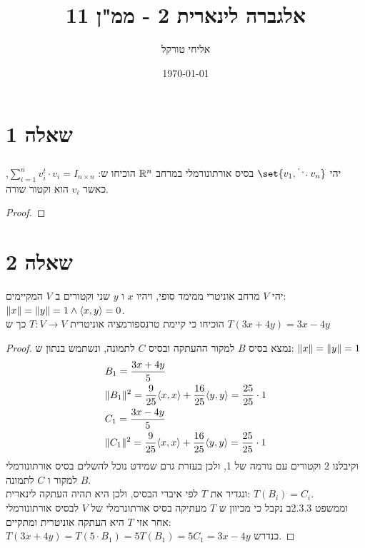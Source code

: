 \documentclass{article}
\title{אלגברה לינארית 2 - ממ"ן 11}
\author{אליחי טורקל \ID}
\date\today
\DeclarePairedDelimiter\set\{\}
\begin{document}
	\maketitle %

	\section*{שאלה 1}
	יהי $\set{v_1, \ddots v_n}$ בסיס אורתונורמלי במרחב $\mathbb{R}^n$
	הוכיחו ש: $\sum_{i=1}^n v_i^t \cdot v_i = I_{n\times n}$, כאשר $v_i$ הוא וקטור שורה.
	\begin{proof}

	\end{proof}

	\pagebreak

	\section*{שאלה 2}
	יהי $V$ מרחב אוניטרי ממימד סופי, ויהיו $x$ ו $y$ שני וקטורים ב $V$ המקיימים: \\
	$\lVert x \rVert = \lVert y \rVert = 1 \land \langle x,y \rangle = 0$. \\
	הוכיחו כי קיימת טרנספורמציה אוניטרית $T: V \rightarrow V$ כך ש $T(3x+4y) = 3x - 4y$

	\begin{proof}
		נמצא בסיס $B$ למקור ההעתקה ובסיס $C$ לתמונה, ונשתמש בנתון ש: ${\lVert x \rVert=\lVert y \rVert=1}$
		\begin{align*}
			&B_1 = \frac{3x + 4y}{5} \\
			&\lVert B_1 \rVert^2 = \frac{9}{25} \langle x,x \rangle + \frac{16}{25} \langle y,y \rangle = \frac{25}{25} \cdot 1 \\
			&C_1 = \frac{3x - 4y}{5} \\
			&\lVert C_1 \rVert^2 = \frac{9}{25} \langle x,x \rangle + \frac{16}{25} \langle y,y \rangle = \frac{25}{25} \cdot 1 \\
		\end{align*}
		וקיבלנו 2 וקטורים עם נורמה של 1, ולכן בעזרת גרם שמידט נוכל להשלים בסיס אורתונורמלי $B$ למקור ו $C$ לתמונה. \\
		ונגדיר את $T$ לפי איברי הבסיס, ולכן היא תהיה העתקה לינארית: $T(B_i) = C_i$. \\
		וממשפט 2.3.3ב נקבל כי מכיוון ש $T$ מעתיקה בסיס אורתונרמלי של $V$ לבסיס אורתונורמלי אחר אזי $T$ היא העתקה אוניטרית ומתקיים: \\
		$T(3x+4y) = T(5 \cdot B_1) = 5T(B_1) = 5C_1 = 3x - 4y$ כנדרש.
	\end{proof}
\end{document}

